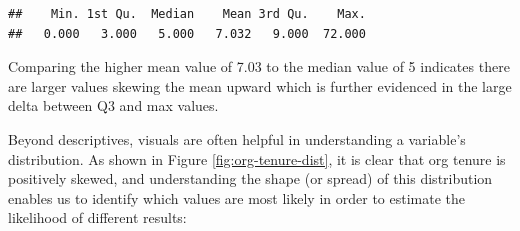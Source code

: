 \documentclass[
]{book}
\newenvironment{Shaded}{\begin{snugshade}}{\end{snugshade}}
\newcommand{\AttributeTok}[1]{\textcolor[rgb]{0.77,0.63,0.00}{#1}}
\newcommand{\CommentTok}[1]{\textcolor[rgb]{0.56,0.35,0.01}{\textit{#1}}}
\newcommand{\FloatTok}[1]{\textcolor[rgb]{0.00,0.00,0.81}{#1}}
\newcommand{\FunctionTok}[1]{\textcolor[rgb]{0.00,0.00,0.00}{#1}}
\newcommand{\NormalTok}[1]{#1}
\newcommand{\OtherTok}[1]{\textcolor[rgb]{0.56,0.35,0.01}{#1}}
\newcommand{\SpecialCharTok}[1]{\textcolor[rgb]{0.00,0.00,0.00}{#1}}
\newcommand{\StringTok}[1]{\textcolor[rgb]{0.31,0.60,0.02}{#1}}
\begin{document}
\begin{Shaded}
\end{Shaded}

\begin{verbatim}
##    Min. 1st Qu.  Median    Mean 3rd Qu.    Max. 
##   0.000   3.000   5.000   7.032   9.000  72.000
\end{verbatim}

Comparing the higher mean value of 7.03 to the median value of 5 indicates there are larger values skewing the mean upward which is further evidenced in the large delta between Q3 and max values.

Beyond descriptives, visuals are often helpful in understanding a variable's distribution. As shown in Figure \ref{fig:org-tenure-dist}, it is clear that org tenure is positively skewed, and understanding the shape (or spread) of this distribution enables us to identify which values are most likely in order to estimate the likelihood of different results:

\begin{Shaded}
\end{Shaded}
\end{document}

